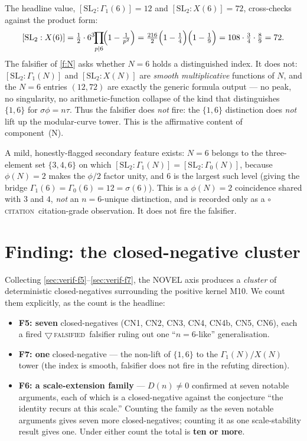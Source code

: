 \documentclass[11pt,a4paper]{article}
\newcommand{\sig}{\sigma}
\newcommand{\Dn}{D(n)}
\newcommand{\tierR}{\textcolor{red!70!black}{$\bigtriangledown$}\,\textsc{falsified}}
\newcommand{\tierC}{\textcolor{orange!85!black}{$\circ$}\,\textsc{citation}}
\theoremstyle{definition}
\begin{document}
The headline value, $[\mathrm{SL}_2:\Gamma_1(6)]=12$ and
$[\mathrm{SL}_2:X(6)]=72$, cross-checks against the product form:
\[
  [\mathrm{SL}_2:X(6)] = \tfrac12\cdot6^3\!\!\prod_{p\mid6}\!\Bigl(1-\tfrac1{p^2}\Bigr)
  = \tfrac{216}{2}\Bigl(1-\tfrac14\Bigr)\Bigl(1-\tfrac19\Bigr)
  = 108\cdot\tfrac34\cdot\tfrac89 = 72.
\]
The falsifier of \textsection\ref{f:N} asks whether $N=6$ holds a distinguished
index. It does not: $[\mathrm{SL}_2:\Gamma_1(N)]$ and $[\mathrm{SL}_2:X(N)]$ are
\emph{smooth multiplicative} functions of $N$, and the $N=6$ entries $(12,72)$
are exactly the generic formula output --- no peak, no singularity, no
arithmetic-function collapse of the kind that distinguishes $\{1,6\}$ for
$\sig\phi=n\tau$. Thus the falsifier does \emph{not} fire: the $\{1,6\}$
distinction does \emph{not} lift up the modular-curve tower. This is the
affirmative content of component~(N).

A mild, honestly-flagged secondary feature exists: $N=6$ belongs to the
three-element set $\{3,4,6\}$ on which $[\mathrm{SL}_2:\Gamma_1(N)]
=[\mathrm{SL}_2:\Gamma_0(N)]$, because $\phi(N)=2$ makes the $\phi/2$ factor
unity, and $6$ is the largest such level (giving the bridge
$\Gamma_1(6)=\Gamma_0(6)=12=\sig(6)$). This is a $\phi(N)=2$ coincidence shared
with $3$ and $4$, \emph{not} an $n=6$-unique distinction, and is recorded only as
a \tierC\ citation-grade observation. It does not fire the falsifier.

\section{Finding: the closed-negative cluster}
\label{sec:finding}

Collecting \textsection\ref{sec:verif-f5}--\ref{sec:verif-f7}, the NOVEL axis
produces a \emph{cluster} of deterministic closed-negatives surrounding the
positive kernel M10. We count them explicitly, as the count is the headline:

\begin{itemize}
\item \textbf{F5: seven} closed-negatives (CN1, CN2, CN3, CN4, CN4b, CN5, CN6),
  each a fired \tierR\ falsifier ruling out one ``$n=6$-like'' generalisation.
\item \textbf{F7: one} closed-negative --- the non-lift of $\{1,6\}$ to the
  $\Gamma_1(N)/X(N)$ tower (the index is smooth, falsifier does not fire in the
  refuting direction).
\item \textbf{F6: a scale-extension family} --- $\Dn\neq0$ confirmed at seven
  notable arguments, each of which is a closed-negative against the conjecture
  ``the identity recurs at this scale.'' Counting the family as the seven
  notable arguments gives seven more closed-negatives; counting it as one
  scale-stability result gives one. Under either count the total is
  \textbf{ten or more}.
\end{itemize}
\end{document}
